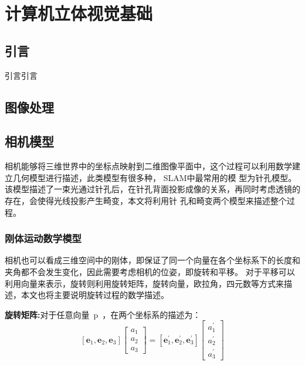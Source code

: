 \chapter{计算机立体视觉基础}
\label{cha:chapVSLAM}
\section{引言}
\label{sec:chapVSLAM.1}
引言引言
\section{图像处理}
\section{相机模型}
相机能够将三维世界中的坐标点映射到二维图像平面中，这个过程可以利用数学建立几何模型进行描述，此类模型有很多种， SLAM中最常用的模
型为针孔模型。该模型描述了一束光通过针孔后，在针孔背面投影成像的关系，再同时考虑透镜的存在，会使得光线投影产生畸变，本文将利用针
孔和畸变两个模型来描述整个过程。

\subsection{刚体运动数学模型}
相机也可以看成三维空间中的刚体，即保证了同一个向量在各个坐标系下的长度和夹角都不会发生变化，因此需要考虑相机的位姿，即旋转和平移。
对于平移可以利用向量来表示，旋转则利用旋转矩阵，旋转向量，欧拉角，四元数等方式来描述，本文也将主要说明旋转过程的数学描述。

\textbf{旋转矩阵:}对于任意向量{~p~}，在两个坐标系的描述为：
\begin{equation}
  \left[\mathbf{e}_{1}, \mathbf{e}_{2}, \mathbf{e}_{3}\right]\left[\begin{array}{l}{a_{1}} \\ {a_{2}} \\ {a_{3}}\end{array}\right]=\left[\mathbf{e}_{1}^{\prime}, \mathbf{e}_{2}^{\prime}, \mathbf{e}_{3}^{\prime}\right]\left[\begin{array}{c}{a_{1}^{\prime}} \\ {a_{2}^{\prime}} \\ {a_{3}^{\prime}}\end{array}\right]
\end{equation}

